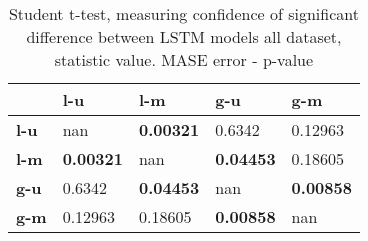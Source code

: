 \begin{table}[H]
\centering
\caption{Student t-test, measuring confidence of significant difference between LSTM models all dataset, statistic value. MASE error - p-value}
\label{table:ttest-p-values-lstm-experiments-MASE-all-datasets}
\begin{tabular}{lllll}
\toprule
{} &               l-u &               l-m &               g-u &               g-m \\
\midrule
\textbf{l-u} &               nan &  \textbf{0.00321} &            0.6342 &           0.12963 \\
\textbf{l-m} &  \textbf{0.00321} &               nan &  \textbf{0.04453} &           0.18605 \\
\textbf{g-u} &            0.6342 &  \textbf{0.04453} &               nan &  \textbf{0.00858} \\
\textbf{g-m} &           0.12963 &           0.18605 &  \textbf{0.00858} &               nan \\
\bottomrule
\end{tabular}
\end{table}
